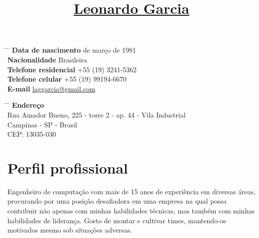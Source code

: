 \documentclass[10pt]{article} %
\begin{document}

\title{\href{https://br.linkedin.com/in/laggarcia}{Leonardo Garcia}} %


\parbox{0.5\textwidth}{ %
\begin{tabbing} %
\hspace{3.5cm} \= \hspace{4cm} \= \kill %
{\bf Data de nascimento}  de março de 1981 \\ %
{\bf Nacionalidade} \> Brasileira \\ %
{\bf Telefone residencial} \> +55 (19) 3241-5362 \\ %
{\bf Telefone celular} \> +55 (19) 99194-6670 \\ %
{\bf E-mail} \> \href{mailto:laggarcia@gmail.com}{laggarcia@gmail.com} \\ %
\end{tabbing}}
\hfill %
\parbox{0.5\textwidth}{ %
\begin{tabbing} %
\hspace{3cm} \= \hspace{4cm} \= \kill %
{\bf Endereço} \\
Rua Amador Bueno, 225 - torre 2 - ap. 44 - Vila Industrial \\ %
Campinas - SP - Brasil \\ %
CEP: 13035-030 \\ %
\end{tabbing}}


\section{Perfil profissional}

Engenheiro de computação com mais de 15 anos de experiência em diversas áreas, procurando por uma posição desafiadora em uma empresa na qual possa contribuir não apenas com minhas habilidades técnicas, mas também com minhas habilidades de liderança. Gosto de montar e cultivar times, mantendo-os motivados mesmo sob situações adversas.
\end{document}
